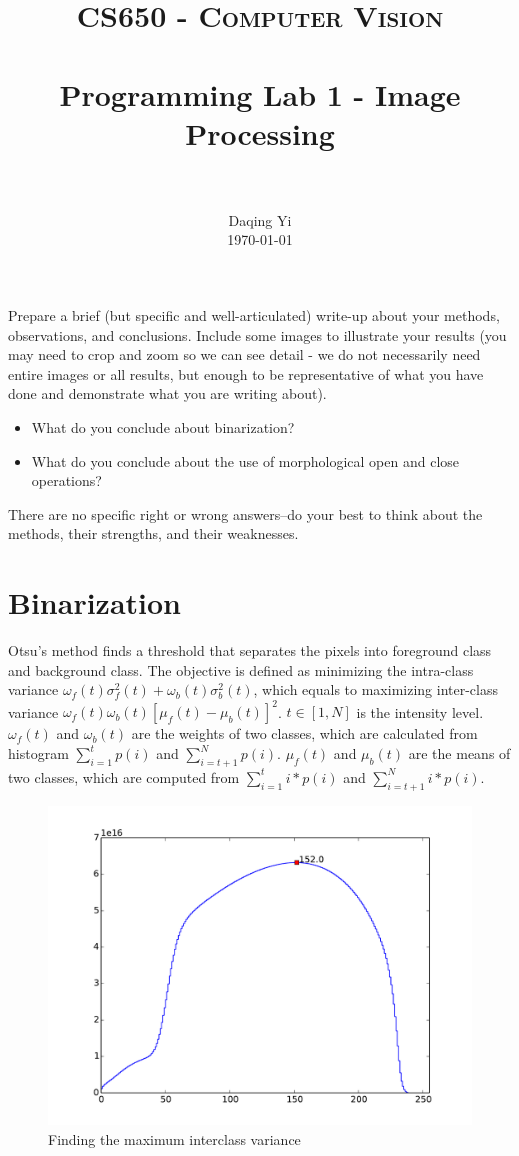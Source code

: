 \documentclass[paper=a4, fontsize=11pt]{scrartcl}
\title{
		\usefont{OT1}{bch}{b}{n}
		\normalfont \normalsize \textsc{CS650 - Computer Vision} \\ [25pt]
		\horrule{0.5pt} \\[0.4cm]
		\huge Programming Lab 1 - Image Processing \\
		\horrule{2pt} \\[0.5cm]
}
\author{
		\normalfont 								\normalsize
        Daqing Yi\\[-3pt]		\normalsize
        \today
}
\date{}
\numberwithin{equation}{section}		%
\numberwithin{figure}{section}			%
\numberwithin{table}{section}				%
\begin{document}
\maketitle

Prepare a brief (but specific and well-articulated) write-up about your methods, observations, and conclusions.
Include some images to illustrate your results (you may need to crop and zoom so we can see detail - we do not necessarily need entire images or all results, but enough to be representative of what you have done and demonstrate what you are writing about).

\begin{itemize}
\item What do you conclude about binarization? 
\item What do you conclude about the use of morphological open and close operations?
\end{itemize}

There are no specific right or wrong answers--do your best to think about the methods, their strengths, and their weaknesses.

\section{Binarization}

Otsu's method finds a threshold that separates the pixels into foreground class and background class.
The objective is defined as minimizing the intra-class variance $ \omega_{f} (t) \sigma_{f}^{2} (t) + \omega_{b} (t) \sigma_{b}^{2} (t) $, which equals to maximizing inter-class variance $ \omega_{f} (t) \omega_{b} (t) [ \mu_{f} (t) - \mu_{b} (t) ]^{2} $.
$ t \in [1, N] $ is the intensity level.
$ \omega_{f} (t) $ and $ \omega_{b} (t) $ are the weights of two classes, which are calculated from histogram $ \sum_{i=1}^{t} p(i) $ and $ \sum_{i=t+1}^{N} p(i) $.
$ \mu_{f} (t) $ and $ \mu_{b} (t) $ are the means of two classes, which are computed from $ \sum_{i=1}^{t} i * p(i) $ and $ \sum_{i=t+1}^{N} i * p(i) $.

\begin{figure}
\centering
\includegraphics[width=0.5\linewidth]{./figure/interclass_variances}
\caption{Finding the maximum interclass variance}
\label{fig:interclass_variances}
\end{figure}
\end{document}
